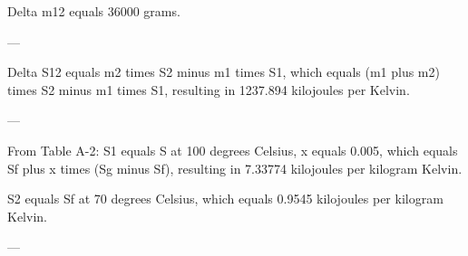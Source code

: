 Delta m12 equals 36000 grams.  

---

Delta S12 equals m2 times S2 minus m1 times S1, which equals (m1 plus m2) times S2 minus m1 times S1, resulting in 1237.894 kilojoules per Kelvin.  

---

From Table A-2:  
S1 equals S at 100 degrees Celsius, x equals 0.005, which equals Sf plus x times (Sg minus Sf), resulting in 7.33774 kilojoules per kilogram Kelvin.  

S2 equals Sf at 70 degrees Celsius, which equals 0.9545 kilojoules per kilogram Kelvin.  

---